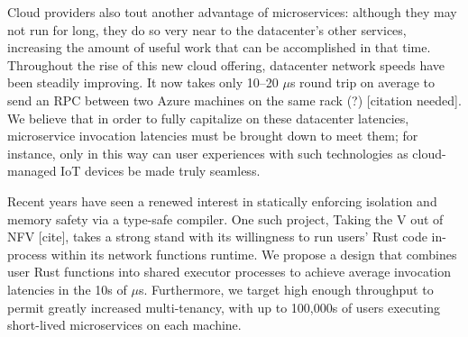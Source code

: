 Cloud providers also tout another advantage of microservices: although they may not run for long, they do so very near to the datacenter's other services, increasing the amount of useful work that can be accomplished in that time.
Throughout the rise of this new cloud offering, datacenter network speeds have been steadily improving.
It now takes only 10--20 $\mu$s round trip on average to send an RPC between two Azure machines on the same rack (?) [citation needed].
We believe that in order to fully capitalize on these datacenter latencies, microservice invocation latencies must be brought down to meet them; for instance, only in this way can user experiences with such technologies as cloud-managed IoT devices be made truly seamless.

Recent years have seen a renewed interest in statically enforcing isolation and memory safety via a type-safe compiler.
One such project, Taking the V out of NFV [cite], takes a strong stand with its willingness to run users' Rust code in-process within its network functions runtime.
We propose a design that combines user Rust functions into shared executor processes to achieve average invocation latencies in the 10s of $\mu$s.
Furthermore, we target high enough throughput to permit greatly increased multi-tenancy, with up to 100,000s of users executing short-lived microservices on each machine.
